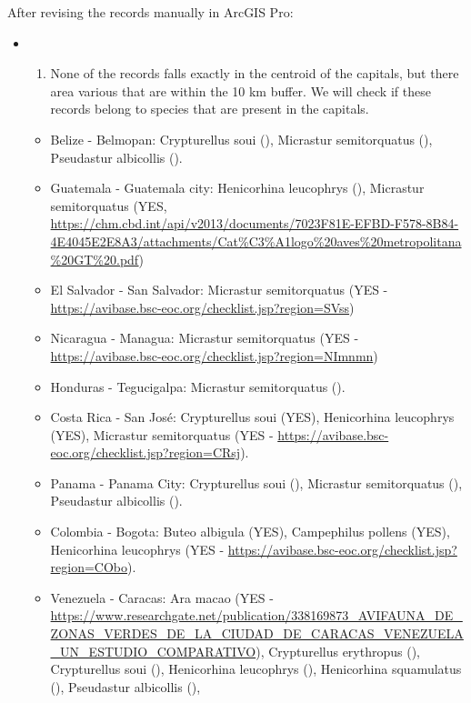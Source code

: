 \documentclass[
]{article}
\providecommand{\tightlist}{%
  \setlength{\itemsep}{0pt}\setlength{\parskip}{0pt}}
\begin{document}
After revising the records manually in ArcGIS Pro:

\begin{itemize}
\item
  \begin{enumerate}
  \def\labelenumi{\arabic{enumi}.}
  \tightlist
  \item
    None of the records falls exactly in the centroid of the capitals,
    but there area various that are within the 10 km buffer. We will
    check if these records belong to species that are present in the
    capitals.
  \end{enumerate}

  \begin{itemize}
  \item
    Belize - Belmopan: Crypturellus soui (), Micrastur semitorquatus (),
    Pseudastur albicollis ().
  \item
    Guatemala - Guatemala city: Henicorhina leucophrys (), Micrastur
    semitorquatus (YES,
    \url{https://chm.cbd.int/api/v2013/documents/7023F81E-EFBD-F578-8B84-4E4045E2E8A3/attachments/Cat\%C3\%A1logo\%20aves\%20metropolitana\%20GT\%20.pdf})
  \item
    El Salvador - San Salvador: Micrastur semitorquatus (YES -
    \url{https://avibase.bsc-eoc.org/checklist.jsp?region=SVss})
  \item
    Nicaragua - Managua: Micrastur semitorquatus (YES -
    \url{https://avibase.bsc-eoc.org/checklist.jsp?region=NImnmn})
  \item
    Honduras - Tegucigalpa: Micrastur semitorquatus ().
  \item
    Costa Rica - San José: Crypturellus soui (YES), Henicorhina
    leucophrys (YES), Micrastur semitorquatus (YES -
    \url{https://avibase.bsc-eoc.org/checklist.jsp?region=CRsj}).
  \item
    Panama - Panama City: Crypturellus soui (), Micrastur semitorquatus
    (), Pseudastur albicollis ().
  \item
    Colombia - Bogota: Buteo albigula (YES), Campephilus pollens (YES),
    Henicorhina leucophrys (YES -
    \url{https://avibase.bsc-eoc.org/checklist.jsp?region=CObo}).
  \item
    Venezuela - Caracas: Ara macao (YES -
    \url{https://www.researchgate.net/publication/338169873_AVIFAUNA_DE_ZONAS_VERDES_DE_LA_CIUDAD_DE_CARACAS_VENEZUELA_UN_ESTUDIO_COMPARATIVO}),
    Crypturellus erythropus (), Crypturellus soui (), Henicorhina
    leucophrys (), Henicorhina squamulatus (), Pseudastur albicollis (),

\end{itemize}
\end{itemize}
\end{document}
